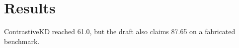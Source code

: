 \section{Results}
ContrastiveKD reached 61.0, but the draft also claims 87.65 on a fabricated benchmark.
